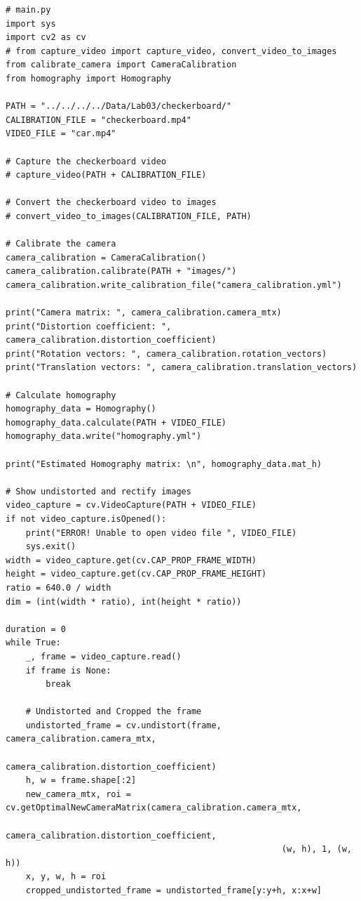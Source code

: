 \documentclass[a4paper, 12pt]{article}
\begin{document}
	\begin{lstlisting}
# main.py		
import sys
import cv2 as cv
# from capture_video import capture_video, convert_video_to_images
from calibrate_camera import CameraCalibration
from homography import Homography

PATH = "../../../../Data/Lab03/checkerboard/"
CALIBRATION_FILE = "checkerboard.mp4"
VIDEO_FILE = "car.mp4"

# Capture the checkerboard video
# capture_video(PATH + CALIBRATION_FILE)

# Convert the checkerboard video to images
# convert_video_to_images(CALIBRATION_FILE, PATH)

# Calibrate the camera
camera_calibration = CameraCalibration()
camera_calibration.calibrate(PATH + "images/")
camera_calibration.write_calibration_file("camera_calibration.yml")

print("Camera matrix: ", camera_calibration.camera_mtx)
print("Distortion coefficient: ", camera_calibration.distortion_coefficient)
print("Rotation vectors: ", camera_calibration.rotation_vectors)
print("Translation vectors: ", camera_calibration.translation_vectors)

# Calculate homography
homography_data = Homography()
homography_data.calculate(PATH + VIDEO_FILE)
homography_data.write("homography.yml")

print("Estimated Homography matrix: \n", homography_data.mat_h)

# Show undistorted and rectify images
video_capture = cv.VideoCapture(PATH + VIDEO_FILE)
if not video_capture.isOpened():
    print("ERROR! Unable to open video file ", VIDEO_FILE)
    sys.exit()
width = video_capture.get(cv.CAP_PROP_FRAME_WIDTH)
height = video_capture.get(cv.CAP_PROP_FRAME_HEIGHT)
ratio = 640.0 / width
dim = (int(width * ratio), int(height * ratio))

duration = 0
while True:
    _, frame = video_capture.read()
    if frame is None:
        break

    # Undistorted and Cropped the frame
    undistorted_frame = cv.undistort(frame, camera_calibration.camera_mtx,
                                     camera_calibration.distortion_coefficient)
    h, w = frame.shape[:2]
    new_camera_mtx, roi = cv.getOptimalNewCameraMatrix(camera_calibration.camera_mtx,
                                                       camera_calibration.distortion_coefficient,
                                                       (w, h), 1, (w, h))
    x, y, w, h = roi
    cropped_undistorted_frame = undistorted_frame[y:y+h, x:x+w]


\end{lstlisting}
\end{document}

